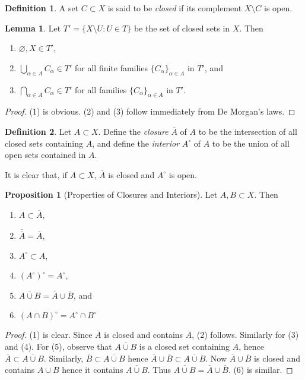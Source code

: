 \documentclass{book}
\theoremstyle{definition}
\newtheorem{proposition}{Proposition}[section]
\newtheorem{lemma}[theorem]{Lemma}
\newtheorem{definition}{Definition}[section]
\theoremstyle{remark}
\begin{document}
\begin{definition}
A set $C\subset X$ is said to be \textit{closed} if its complement $X\setminus C$ is open.
\end{definition}

\begin{lemma}
Let $T'=\{X\setminus U:U\in T\}$ be the set of closed sets in $X$. Then
\begin{enumerate}
    \item $\varnothing,X\in T'$,
    \item $\bigcup_{\alpha\in A} C_\alpha\in T'$ for all finite families $\{C_\alpha\}_{\alpha\in A}$ in $T'$, and
    \item $\bigcap_{\alpha\in A} C_\alpha\in T'$ for all families $\{C_\alpha\}_{\alpha\in A}$ in $T'$.
\end{enumerate}
\end{lemma}
\begin{proof}
(1) is obvious. (2) and (3) follow immediately from De Morgan's laws.
\end{proof}

\begin{definition}
Let $A\subset X$. Define the \textit{closure} $\overline A$ of $A$ to be the intersection of all closed sets containing $A$, and define the \textit{interior} $A^\circ$ of $A$ to be the union of all open sets contained in $A$.
\end{definition}

It is clear that, if $A\subset X$, $\overline A$ is closed and $A^\circ$ is open.

\begin{proposition}[Properties of Closures and Interiors]
Let $A,B\subset X$. Then
\begin{enumerate}
    \item $A\subset\overline A$,
    \item $\overline{\overline A}=\overline A$,
    \item $A^\circ\subset A$,
    \item $(A^\circ)^\circ =A^\circ$,
    \item $\overline {A\cup B}=\overline A\cup\overline B$, and
    \item $(A\cap B)^\circ=A^\circ\cap B^\circ$
\end{enumerate}
\end{proposition}
\begin{proof}
(1) is clear. Since $\overline A$ is closed and contains $\overline A$, (2) follows. Similarly for (3) and (4). For (5), observe that $\overline{A\cup B}$ is a closed set containing $A$, hence $\overline A\subset \overline{A\cup B}$. Similarly, $\overline B\subset \overline{A\cup B}$ hence $\overline A\cup\overline B\subset \overline{A\cup B}$. Now $\overline A\cup \overline B$ is closed and contains $A\cup B$ hence it contains $\overline{A\cup B}$. Thus $\overline {A\cup B}=\overline A\cup\overline B$. (6) is similar.
\end{proof}
\end{document}
